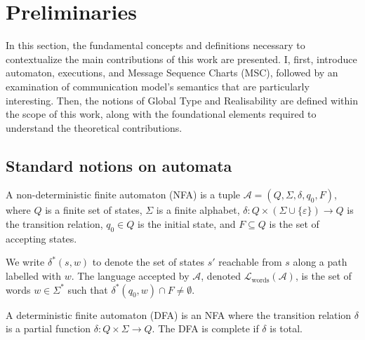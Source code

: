 \chapter{Preliminaries}\label{sec:pre}
In this section, the fundamental concepts and definitions necessary 
to contextualize the main contributions of this work are presented. 
I, first, introduce automaton, executions, and
Message Sequence Charts (MSC), followed by 
an examination of communication model's semantics that are particularly 
interesting. 
Then, the notions of Global Type and Realisability are 
defined within the scope of this work, along with the foundational 
elements required to understand the theoretical contributions.

\section{Standard notions on automata}

\bigskip

\begin{definition}[NFA]\label{def:nfa}
A non-deterministic finite automaton (NFA) is a tuple  
$\mathcal{A} = (Q, \Sigma, \delta, q_0, F)$, where $Q$ is a finite set of  
states, $\Sigma$ is a finite alphabet,  
$\delta : Q \times (\Sigma \cup \{\varepsilon\}) \to Q$ is the transition  
relation, $q_0 \in Q$ is the initial state, and $F \subseteq Q$ is the set  
of accepting states.  

We write $\delta^*(s,w)$ to denote the set of states $s'$ reachable from  
$s$ along a path labelled with $w$. The language accepted by $\mathcal{A}$,  
denoted $\mathcal{L}_{\text{words}}(\mathcal{A})$, is the set of words  
$w \in \Sigma^*$ such that $\delta^*(q_0,w) \cap F \neq \emptyset$.  
\end{definition}

\bigskip

\begin{definition}[DFA]\label{def:dfa}
A deterministic finite automaton (DFA) is an NFA where the transition  
relation $\delta$ is a partial function  
$\delta : Q \times \Sigma \to Q$. The DFA is complete if $\delta$ is  
total.  

\end{definition}

